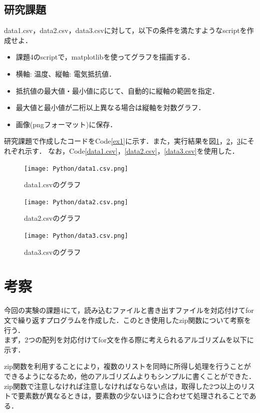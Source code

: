 \documentclass[a4paper,11pt]{jsarticle}
\begin{document}
\subsection{研究課題}
  \begin{screen}
    data1.csv，data2.csv，data3.csvに対して，以下の条件を満たすようなscriptを作成せよ．
    \begin{itemize}
      \item 課題4のscriptで，matplotlibを使ってグラフを描画する．
      \item 横軸: 温度、縦軸: 電気抵抗値．
      \item 抵抗値の最大値・最小値に応じて、自動的に縦軸の範囲を指定．
      \item 最大値と最小値が二桁以上異なる場合は縦軸を対数グラフ．
      \item 画像(pngフォーマット)に保存．
    \end{itemize}
  \end{screen}
  研究課題で作成したコードをCode\ref{ex1}に示す．また，実行結果を図\ref{ex1p}，\ref{ex2p}，\ref{ex3p}にそれぞれ示す．
  なお，Code\ref{data1.csv}，\ref{data2.csv}，\ref{data3.csv}を使用した．
  
  \begin{figure}[H]
    \centering
    \texttt{[image: Python/data1.csv.png]}
    \caption{data1.csvのグラフ}
    \label{ex1p}
  \end{figure}
  \begin{figure}[H]
    \centering
    \texttt{[image: Python/data2.csv.png]}
    \caption{data2.csvのグラフ}
    \label{ex2p}
  \end{figure}
  \begin{figure}[H]
    \centering
    \texttt{[image: Python/data3.csv.png]}
    \caption{data3.csvのグラフ}
    \label{ex3p}
  \end{figure}

\section{考察}
  今回の実験の課題4にて，読み込むファイルと書き出すファイルを対応付けてfor文で繰り返すプログラムを作成した．このとき使用したzip関数について考察を行う．\cite{zip}\\
  まず，2つの配列を対応付けてfor文を作る際に考えられるアルゴリズムを以下に示す．
  
  
  zip関数を利用することにより，複数のリストを同時に所得し処理を行うことができるようになるため，他のアルゴリズムよりもシンプルに書くことができた．
  zip関数で注意しなければ注意しなければならない点は，取得した2つ以上のリストで要素数が異なるときは，要素数の少ないほうに合わせて処理されることである．
\end{document}
